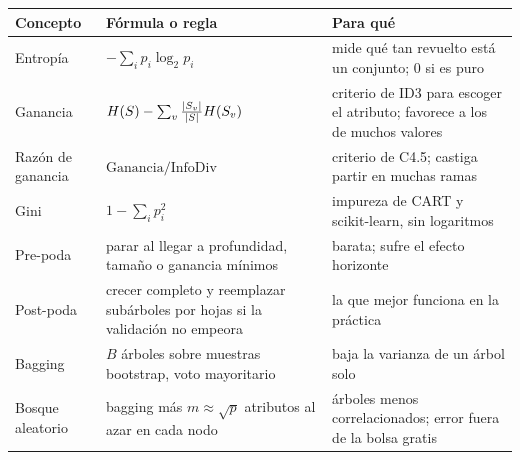 \documentclass[11pt,letterpaper]{article}
\begin{document}
\begin{center}
\small
\begin{tabular}{l>{\raggedright\arraybackslash}p{4.6cm}%
                 >{\raggedright\arraybackslash}p{6.4cm}}
    \toprule
    \textbf{Concepto} & \textbf{Fórmula o regla} & \textbf{Para qué} \\
    \midrule
    Entropía & $-\sum_i p_i \log_2 p_i$
             & mide qué tan revuelto está un conjunto; $0$ si es puro \\
    \addlinespace
    Ganancia & $H(S) - \sum_v \frac{\left\lvert S_v \right\rvert}{\left\lvert S \right\rvert} H(S_v)$
             & criterio de ID3 para escoger el atributo; favorece a
               los de muchos valores \\
    \addlinespace
    Razón de ganancia & $\text{Ganancia} / \text{InfoDiv}$
                      & criterio de C4.5; castiga partir en muchas
                        ramas \\
    \addlinespace
    Gini & $1 - \sum_i p_i^2$
         & impureza de CART y scikit-learn, sin logaritmos \\
    \addlinespace
    Pre-poda & parar al llegar a profundidad, tamaño o ganancia mínimos
             & barata; sufre el efecto horizonte \\
    \addlinespace
    Post-poda & crecer completo y reemplazar subárboles por hojas si
                la validación no empeora
              & la que mejor funciona en la práctica \\
    \addlinespace
    Bagging & $B$ árboles sobre muestras bootstrap, voto mayoritario
            & baja la varianza de un árbol solo \\
    \addlinespace
    Bosque aleatorio & bagging más $m \approx \sqrt{p}$ atributos al
                       azar en cada nodo
                     & árboles menos correlacionados; error fuera de la
                       bolsa gratis \\
    \bottomrule
\end{tabular}
\end{center}


\newpage


\end{document}
